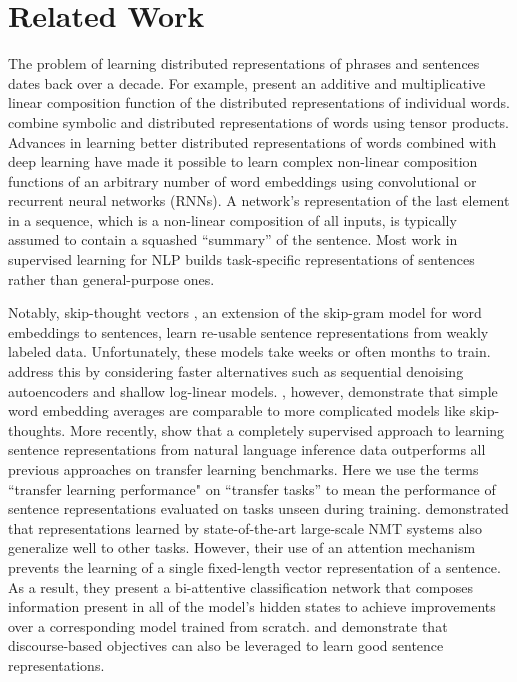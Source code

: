 \documentclass{article} \usepackage{iclr2018_conference,times}
\begin{document}
\section{Related Work}
The problem of learning distributed representations of phrases and sentences dates back over a decade. For example, \cite{mitchell2008vector} present an additive and multiplicative linear composition function of the distributed representations of individual words. \cite{clark2007combining} combine symbolic and distributed representations of words using tensor products. Advances in learning better distributed representations of words \citep{mikolov2013distributed,pennington2014glove} combined with deep learning have made it possible to learn complex non-linear composition functions of an arbitrary number of word embeddings using convolutional or recurrent neural networks (RNNs). A network's representation of the last element in a sequence, which is a non-linear composition of all inputs, is typically assumed to contain a squashed ``summary'' of the sentence. Most work in supervised learning for NLP builds task-specific representations of sentences rather than general-purpose ones.

Notably, skip-thought vectors \citep{kiros2015skip}, an extension of the skip-gram model for word embeddings \citep{mikolov2013distributed} to sentences, learn re-usable sentence representations from weakly labeled data. Unfortunately, these models take weeks or often months to train. \cite{hill2016learning} address this by considering faster alternatives such as sequential denoising autoencoders and shallow log-linear models. \cite{arora2016simple}, however, demonstrate that simple word embedding averages are comparable to more complicated models like skip-thoughts. More recently, \cite{conneau2017supervised} show that a completely supervised approach to learning sentence representations from natural language inference data outperforms all previous approaches on transfer learning benchmarks. Here we use the terms ``transfer learning performance" on ``transfer tasks'' to mean the performance of sentence representations evaluated on tasks unseen during training. \cite{mccann2017learned} demonstrated that representations learned by state-of-the-art large-scale NMT systems also generalize well to other tasks. However, their use of an attention mechanism prevents the learning of a single fixed-length vector representation of a sentence. As a result, they present a bi-attentive classification network that composes information present in all of the model's hidden states to achieve improvements over a corresponding model trained from scratch. \cite{jernite2017discourse} and \cite{nie2017dissent} demonstrate that discourse-based objectives can also be leveraged to learn good sentence representations.
\end{document}
